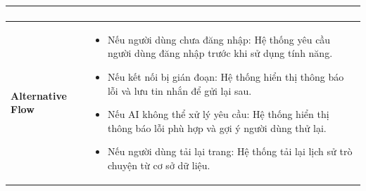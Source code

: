 \begin{longtable}{|>{\bfseries}m{4cm}|m{10cm}|}
\begin{enumerate}
\end{enumerate} \\
\hline
Alternative Flow &
\begin{itemize}
    \item Nếu người dùng chưa đăng nhập: Hệ thống yêu cầu người dùng đăng nhập trước khi sử dụng tính năng.
    \item Nếu kết nối bị gián đoạn: Hệ thống hiển thị thông báo lỗi và lưu tin nhắn để gửi lại sau.
    \item Nếu AI không thể xử lý yêu cầu: Hệ thống hiển thị thông báo lỗi phù hợp và gợi ý người dùng thử lại.
    \item Nếu người dùng tải lại trang: Hệ thống tải lại lịch sử trò chuyện từ cơ sở dữ liệu.
\end{itemize} \\
\hline
\end{longtable}

